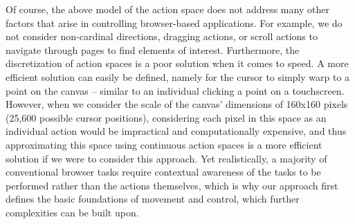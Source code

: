 \documentclass[10pt,journal,compsoc]{IEEEtran}
\begin{document}
Of course, the above model of the action space does not address many other factors that arise in controlling browser-based applications. For example, we do not consider non-cardinal directions, dragging actions, or scroll actions to navigate through pages to find elements of interest. Furthermore, the discretization of action spaces is a poor solution when it comes to speed. A more efficient solution can easily be defined, namely for the cursor to simply warp to a point on the canvas -- similar to an individual clicking a point on a touchscreen. However, when we consider the scale of the canvas' dimensions of 160x160 pixels (25,600 possible cursor positions), considering each pixel in this space as an individual action would be impractical and computationally expensive, and thus approximating this space using continuous action spaces is a more efficient solution if we were to consider this approach. Yet realistically, a majority of conventional browser tasks require contextual awareness of the tasks to be performed rather than the actions themselves, which is why our approach first defines the basic foundations of movement and control, which further complexities can be built upon.
\end{document}
